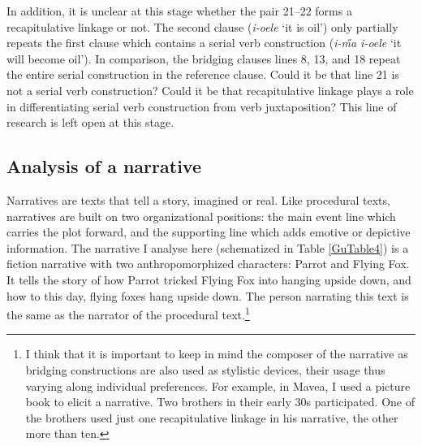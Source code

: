 \documentclass[output=paper]{LSP/langsci}
\begin{document}
In addition, it is unclear at this stage whether the pair 21--22 forms a recapitulative linkage or not.  The second clause (\textit{i-oele} `it is oil') only partially repeats the first clause which contains a serial verb construction (\textit{i-\H{m}a i-oele} `it will become oil'). In comparison, the bridging clauses lines 8, 13, and 18 repeat the entire serial construction in the reference clause. Could it be that line 21 is not a serial verb construction? Could it be that recapitulative linkage plays a role in differentiating serial verb construction from verb juxtaposition? This line of research is left open at this stage.

\subsection{Analysis of a narrative}
\label{Gunarrative}
Narratives are texts that tell a story, imagined or real. Like procedural texts, narratives are built on two organizational positions: the main event line which carries the plot forward, and the supporting line which adds emotive or depictive information. The narrative I analyse here (schematized in Table \ref{GuTable4}) is a fiction narrative with two anthropomorphized characters: Parrot and Flying Fox. It tells the story of how Parrot tricked Flying Fox into hanging upside down, and how to this day, flying foxes hang upside down. The person narrating this text is the same as the narrator of the procedural text.\footnote{I think that it is important to keep in mind the composer of the narrative \citep[][17]{longacre83} as bridging constructions are also used as stylistic devices, their usage thus varying along individual preferences. For example, in Mavea, I used a picture book to elicit a narrative. Two brothers in their early 30s participated. One of the brothers used just one recapitulative linkage in his narrative, the other more than ten.}
\end{document}

